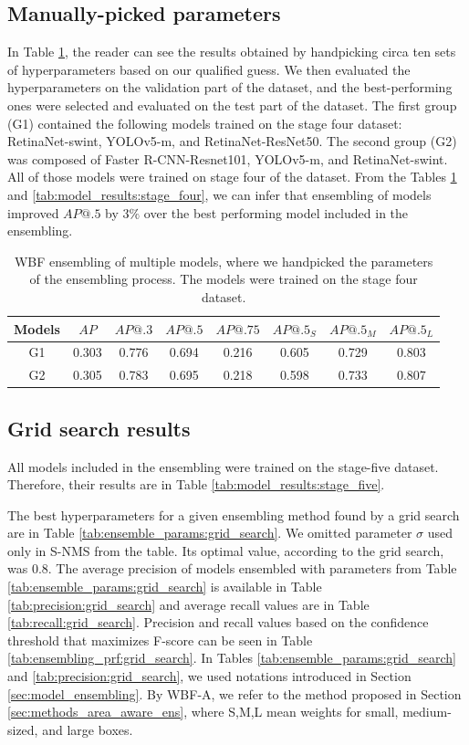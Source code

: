\subsection{Manually-picked parameters}
\label{subsec:handpicked}
In Table \ref{tab:model_ensembling:handpicked}, the reader can see the results obtained by handpicking circa ten sets of hyperparameters based on our qualified guess. We then evaluated the hyperparameters on the validation part of the dataset, and the best-performing ones were selected and evaluated on the test part of the dataset. The first group (G1) contained the following models trained on the stage four dataset: RetinaNet-swint, YOLOv5-m, and RetinaNet-ResNet50. The second group (G2) was composed of Faster R-CNN-Resnet101, YOLOv5-m, and RetinaNet-swint. All of those models were trained on stage four of the dataset. From the Tables \ref{tab:model_ensembling:handpicked} and \ref{tab:model_results:stage_four}, we can infer that ensembling of models improved $AP@.5$ by $3\%$ over the best performing model included in the ensembling.
\begin{table}[H]
    \begin{tabular}{|c|c|c|c|c|c|c|c|}
        \hline
        Models & $AP$  & $AP@.3$ & $AP@.5$ & $AP@.75$ & $AP@.5_S$ & $AP@.5_M$ & $AP@.5_L$ \\ \hline
        G1     & 0.303 & 0.776   & 0.694   & 0.216    & 0.605     & 0.729     & 0.803     \\ \hline
        G2     & 0.305 & 0.783   & 0.695   & 0.218    & 0.598     & 0.733     & 0.807     \\ \hline
    \end{tabular}
    \caption{WBF ensembling of multiple models, where we handpicked the parameters of the ensembling process. The models were trained on the stage four dataset.}
    \label{tab:model_ensembling:handpicked}
\end{table}
\subsection{Grid search results}
\label{subsec:gridsearched}
All models included in the ensembling were trained on the stage-five dataset. Therefore, their results are in Table \ref{tab:model_results:stage_five}.

The best hyperparameters for a given ensembling method found by a grid search are in Table \ref{tab:ensemble_params:grid_search}. We omitted parameter $\sigma$ used only in S-NMS from the table. Its optimal value, according to the grid search, was $0.8$.
The average precision of models ensembled with parameters from Table \ref{tab:ensemble_params:grid_search} is available in Table \ref{tab:precision:grid_search} and average recall values are in Table \ref{tab:recall:grid_search}. Precision and recall values based on the confidence threshold that maximizes F-score can be seen in Table \ref{tab:ensembling_prf:grid_search}. In Tables \ref{tab:ensemble_params:grid_search} and \ref{tab:precision:grid_search}, we used notations introduced in Section \ref{sec:model_ensembling}. By WBF-A, we refer to the method proposed in Section \ref{sec:methods_area_aware_ens}, where S,M,L mean weights for small, medium-sized, and large boxes.


